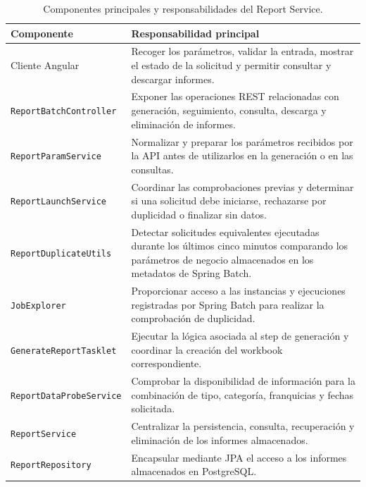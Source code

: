 \documentclass[11pt,a4paper,titlepage,oneside]{report}
\newcommand{\tfgtablestyle}{%
  \small
  \setlength{\tabcolsep}{4pt}%
  \renewcommand{\arraystretch}{1.15}%
  \rowcolors{2}{udcgray!08}{white}%
}
\begin{document}
\begin{table}[H]
  \centering
  \tfgtablestyle
  \caption{Componentes principales y responsabilidades del Report Service.}
  \label{tab:componentes-responsabilidades}

  \begin{tabularx}{0.97\textwidth}{@{}p{}X@{}}

    \toprule
    \rowcolor{udcpink!20}

    \textbf{Componente} &
    \textbf{Responsabilidad principal} \\

    \midrule

    Cliente Angular &
    Recoger los parámetros, validar la entrada, mostrar el estado de la
    solicitud y permitir consultar y descargar informes. \\

    \texttt{ReportBatchController} &
    Exponer las operaciones REST relacionadas con generación, seguimiento,
    consulta, descarga y eliminación de informes. \\

    \texttt{ReportParamService} &
    Normalizar y preparar los parámetros recibidos por la API antes de
    utilizarlos en la generación o en las consultas. \\

    \texttt{ReportLaunchService} &
    Coordinar las comprobaciones previas y determinar si una solicitud debe
    iniciarse, rechazarse por duplicidad o finalizar sin datos. \\

    \texttt{ReportDuplicateUtils} &
    Detectar solicitudes equivalentes ejecutadas durante los últimos cinco
    minutos comparando los parámetros de negocio almacenados en los metadatos
    de Spring Batch. \\

    \texttt{JobExplorer} &
    Proporcionar acceso a las instancias y ejecuciones registradas por Spring
    Batch para realizar la comprobación de duplicidad. \\

    \texttt{GenerateReportTasklet} &
    Ejecutar la lógica asociada al step de generación y coordinar la creación
    del workbook correspondiente. \\

    \texttt{ReportDataProbeService} &
    Comprobar la disponibilidad de información para la combinación de tipo,
    categoría, franquicias y fechas solicitada. \\

    \texttt{ReportService} &
    Centralizar la persistencia, consulta, recuperación y eliminación de los
    informes almacenados. \\

    \texttt{ReportRepository} &
    Encapsular mediante JPA el acceso a los informes almacenados en
    PostgreSQL. \\

    \bottomrule
  \end{tabularx}

\end{table}
\end{document}
